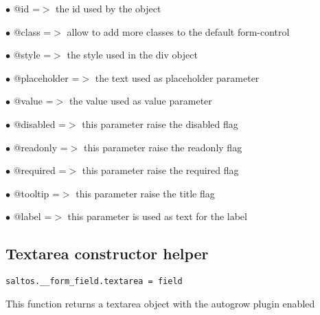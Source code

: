 \documentclass[a4paper]{book}
\begin{document}
\begin{compactitem}
\item[\color{myblue}$\bullet$] @id          =$>$ the id used by the object
\item[\color{myblue}$\bullet$] @class       =$>$ allow to add more classes to the default form-control
\item[\color{myblue}$\bullet$] @style       =$>$ the style used in the div object
\item[\color{myblue}$\bullet$] @placeholder =$>$ the text used as placeholder parameter
\item[\color{myblue}$\bullet$] @value       =$>$ the value used as value parameter
\item[\color{myblue}$\bullet$] @disabled    =$>$ this parameter raise the disabled flag
\item[\color{myblue}$\bullet$] @readonly    =$>$ this parameter raise the readonly flag
\item[\color{myblue}$\bullet$] @required    =$>$ this parameter raise the required flag
\item[\color{myblue}$\bullet$] @tooltip     =$>$ this parameter raise the title flag
\item[\color{myblue}$\bullet$] @label       =$>$ this parameter is used as text for the label
\end{compactitem}

\hypertarget{toc382}{}
\subsection{Textarea constructor helper}

\begin{lstlisting}
saltos.__form_field.textarea = field
\end{lstlisting}

This function returns a textarea object with the autogrow plugin enabled
\end{document}
